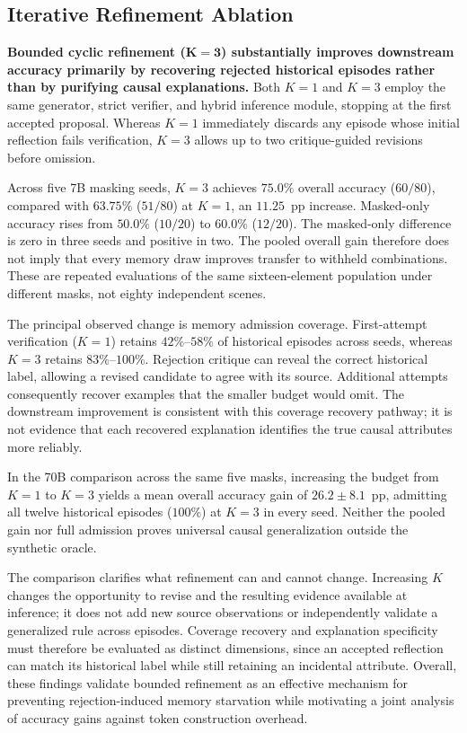 \documentclass[10pt,a4paper,onecolumn]{article}
\theoremstyle{definition}
\theoremstyle{remark}
\begin{document}
\subsection{Iterative Refinement Ablation}
\label{sec:exp3}
\textbf{Bounded cyclic refinement ($\boldsymbol{K=3}$) substantially improves downstream accuracy primarily by recovering rejected historical episodes rather than by purifying causal explanations.} Both $K=1$ and $K=3$ employ the same generator, strict verifier, and hybrid inference module, stopping at the first accepted proposal. Whereas $K=1$ immediately discards any episode whose initial reflection fails verification, $K=3$ allows up to two critique-guided revisions before omission.

Across five 7B masking seeds, $K=3$ achieves $75.0\%$ overall accuracy ($60/80$), compared with $63.75\%$ ($51/80$) at $K=1$, an $11.25$~pp increase. Masked-only accuracy rises from $50.0\%$ ($10/20$) to $60.0\%$ ($12/20$). The masked-only difference is zero in three seeds and positive in two. The pooled overall gain therefore does not imply that every memory draw improves transfer to withheld combinations. These are repeated evaluations of the same sixteen-element population under different masks, not eighty independent scenes.

The principal observed change is memory admission coverage. First-attempt verification ($K=1$) retains $42\%$--$58\%$ of historical episodes across seeds, whereas $K=3$ retains $83\%$--$100\%$. Rejection critique can reveal the correct historical label, allowing a revised candidate to agree with its source. Additional attempts consequently recover examples that the smaller budget would omit. The downstream improvement is consistent with this coverage recovery pathway; it is not evidence that each recovered explanation identifies the true causal attributes more reliably.

In the 70B comparison across the same five masks, increasing the budget from $K=1$ to $K=3$ yields a mean overall accuracy gain of $26.2 \pm 8.1$~pp, admitting all twelve historical episodes ($100\%$) at $K=3$ in every seed. Neither the pooled gain nor full admission proves universal causal generalization outside the synthetic oracle.

The comparison clarifies what refinement can and cannot change. Increasing $K$ changes the opportunity to revise and the resulting evidence available at inference; it does not add new source observations or independently validate a generalized rule across episodes. Coverage recovery and explanation specificity must therefore be evaluated as distinct dimensions, since an accepted reflection can match its historical label while still retaining an incidental attribute. Overall, these findings validate bounded refinement as an effective mechanism for preventing rejection-induced memory starvation while motivating a joint analysis of accuracy gains against token construction overhead.
\end{document}
